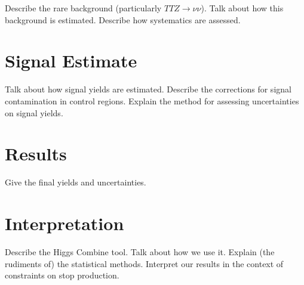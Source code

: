 Describe the rare background (particularly $TTZ \rightarrow \nu\nu$).
Talk about how this background is estimated.
Describe how systematics are assessed.

\section{Signal Estimate}
\label{sec:stop:signal}

Talk about how signal yields are estimated.
Describe the corrections for signal contamination in control regions.
Explain the method for assessing uncertainties on signal yields.

\section{Results}
\label{sec:stop:results}

Give the final yields and uncertainties.

\section{Interpretation}
\label{sec:stop:interp}

Describe the Higgs Combine tool.
Talk about how we use it.
Explain (the rudiments of) the statistical methods.
Interpret our results in the context of constraints on stop production.


